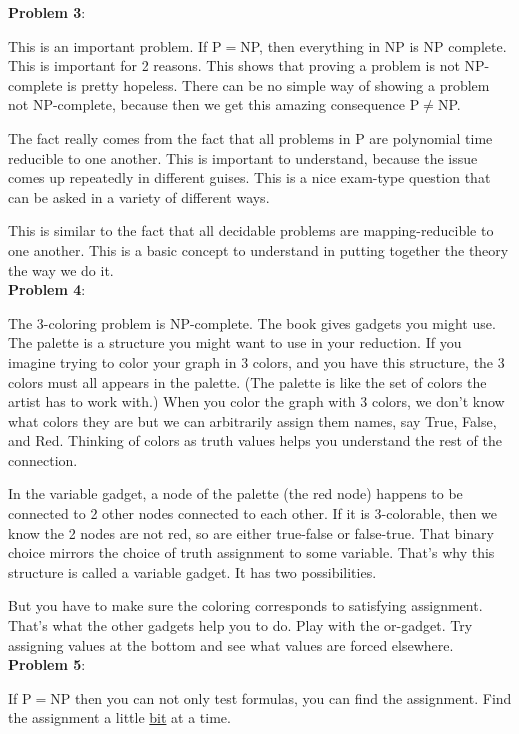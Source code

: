 \textbf{Problem 3}:

This is an important problem. If P$=$NP, then everything in NP is NP complete. This is important for 2 reasons. This shows that proving a problem is not NP-complete is pretty hopeless. There can be no simple way of showing a problem not NP-complete, because then we get this amazing consequence P$\ne$NP.

The fact really comes from the fact that all problems in P are polynomial time reducible to one another. This is important to understand, because the issue comes up repeatedly in different guises. This is a nice exam-type question that can be asked in a variety of different ways. 

This is similar to the fact that all decidable problems are mapping-reducible to one another. This is a basic concept to understand in putting together the theory the way we do it.\\

\textbf{Problem 4}:

The 3-coloring problem is NP-complete. The book gives gadgets you might use. The palette is a structure you might want to use in your reduction. If you imagine trying to color your graph in 3 colors, and you have this structure, the 3 colors must all appears in the palette. (The palette is like the set of colors the artist has to work with.) When you color the graph with 3 colors, we don't know what colors they are but we can arbitrarily assign them names, say True, False, and Red. Thinking of colors as truth values helps you understand the rest of the connection. 

In the variable gadget, a node of the palette (the red node) happens to be connected to 2 other nodes connected to each other. If it is 3-colorable, then we know the 2 nodes are not red, so are either true-false or false-true. That binary choice mirrors the choice of truth assignment to some variable. That's why this structure is called a variable gadget. It has two possibilities. %

But you have to make sure the coloring corresponds to satisfying assignment. That's what the other gadgets help you to do. Play with the or-gadget. Try assigning values at the bottom and see what values are forced elsewhere. \\

\textbf{Problem 5}:

If P$=$NP then you can not only test formulas, you can find the assignment. Find the assignment a little \ul{bit} at a time.\\

